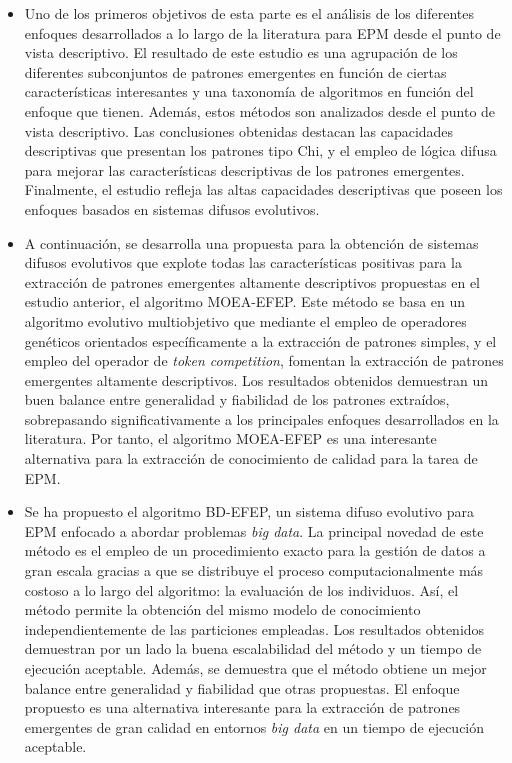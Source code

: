 \documentclass[c5paper,10pt,twoside]{book}	   	%
\begin{document}
\begin{itemize}
	\item Uno de los primeros objetivos de esta parte es el análisis de los diferentes enfoques desarrollados a lo largo de la literatura para \ac{EPM} desde el punto de vista descriptivo. El resultado de este estudio es una agrupación de los diferentes subconjuntos de patrones emergentes en función de ciertas características interesantes y una taxonomía de algoritmos en función del enfoque que tienen. Además, estos métodos son analizados desde el punto de vista descriptivo. Las conclusiones obtenidas destacan las capacidades descriptivas que presentan los patrones tipo Chi, y el empleo de lógica difusa para mejorar las características descriptivas de los patrones emergentes. Finalmente, el estudio refleja las altas capacidades descriptivas que poseen los enfoques basados en sistemas difusos evolutivos.
	
	\item A continuación, se desarrolla una propuesta para la obtención de sistemas difusos evolutivos que explote todas las características positivas para la extracción de patrones emergentes altamente descriptivos propuestas en el estudio anterior, el algoritmo MOEA-EFEP. Este método se basa en un algoritmo evolutivo multiobjetivo que mediante el empleo de operadores genéticos orientados específicamente a la extracción de patrones simples, y el empleo del operador de \textit{token competition}, fomentan la extracción de patrones emergentes altamente descriptivos. Los resultados obtenidos demuestran un buen balance entre generalidad y fiabilidad de los patrones extraídos, sobrepasando significativamente a los principales enfoques desarrollados en la literatura. Por tanto, el algoritmo MOEA-EFEP es una interesante alternativa para la extracción de conocimiento de calidad para la tarea de \ac{EPM}.
	
	\item Se ha propuesto el algoritmo BD-EFEP, un sistema difuso evolutivo para \ac{EPM} enfocado a abordar problemas \textit{big data}. La principal novedad de este método es el empleo de un procedimiento exacto para la gestión de datos a gran escala gracias a que se distribuye el proceso computacionalmente más costoso a lo largo del algoritmo: la evaluación de los individuos. Así, el método permite la obtención del mismo modelo de conocimiento independientemente de las particiones empleadas. Los resultados obtenidos demuestran por un lado la buena escalabilidad del método y un tiempo de ejecución aceptable. Además, se demuestra que el método obtiene un mejor balance entre generalidad y fiabilidad que otras propuestas. El enfoque propuesto es una alternativa interesante para la extracción de patrones emergentes de gran calidad en entornos \textit{big data} en un tiempo de ejecución aceptable. 


\end{itemize}
\end{document}
